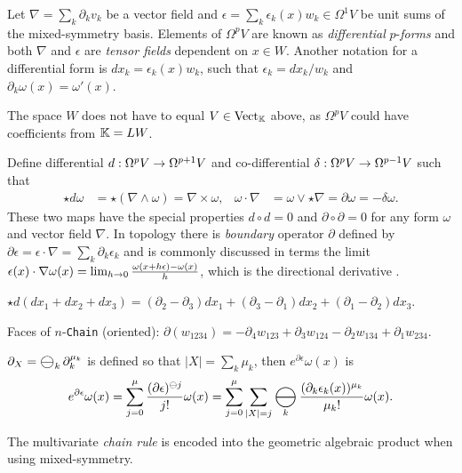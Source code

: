 \documentclass{juliacon}
\DeclareMathOperator*{\bigominus}{\scalerel*{\ominus}{\bigodot}}
\begin{document}
\begin{definition}
	Let $\nabla = \sum_k\partial_kv_k$ be a vector field and $\epsilon = \sum_k\epsilon_k(x)w_k \in \Omega^1V$ be unit sums of the mixed-symmetry basis.
	Elements of $\Omega^pV$ are known as \textit{differential} $p$-\textit{forms} and both $\nabla$ and $\epsilon$ are \textit{tensor fields} dependent on $x\in W$.
	Another notation for a differential form is $dx_k = \epsilon_k(x)w_k$, such that $\epsilon_k = dx_k/w_k$ and $\partial_k\omega(x) = \omega'(x)$.
\end{definition}
\begin{remark}
	The space $W$ does not have to equal $V\in\text{Vect}_{\mathbb{K}}$ above, as $\Omega^pV$ could have coefficients from $\mathbb{K} = LW$.
\end{remark}
\begin{definition}
	Define differential $d:\Omega^p V\rightarrow\Omega^{p+1}V$ and co-differential $\delta:\Omega^pV\rightarrow\Omega^{p-1}V$ such that \cite{bishop-goldberg}
	\begin{align*}
		\star d\omega &= \star(\nabla\wedge\omega) = \nabla\times\omega, & \omega\cdot\nabla &= \omega\vee\star\nabla = \partial\omega =-\delta\omega.
	\end{align*}
	These two maps have the special properties $d\circ d=0$ and $\partial\circ\partial = 0$ for any form $\omega$ and vector field $\nabla$. 
	In topology there is \textit{boundary} operator $\partial$ defined by $\partial\epsilon = \epsilon\cdot\nabla = \sum_k\partial_k\epsilon_k$ and is commonly discussed in terms the limit $\epsilon(x)\cdot\nabla\omega(x) = \lim_{h\rightarrow0} \frac{\omega(x+h\epsilon)-\omega(x)}{h}$, which is the directional derivative \cite{sobczyk}.
\end{definition}
\begin{example}
	$\star d(dx_1+dx_2+dx_3) = (∂_2 -∂_3)dx_1 + (∂_3 -∂_1)dx_2 + (∂_1 -∂_2)dx_3$.
\end{example}
\begin{example}
	Faces of $n$-\verb`Chain` (oriented): $\partial(w_{1234}) = -\partial_4w_{123}+\partial_3w_{124}-\partial_2w_{134}+\partial_1w_{234}$.
\end{example}
\begin{theorem}
	$\partial_X=\bigominus_k\partial_k^{\mu_k}$ is defined so that $|X|=\sum_k\mu_k$, then $e^{\partial\epsilon}\omega(x)$ is
	\begin{align*}
		e^{\partial\epsilon}\omega(x) =
		\sum_{j=0}^\mu \frac{(\partial\epsilon)^{\ominus j}}{j!}\omega(x)
		= \sum_{j=0}^\mu\sum_{|X|=j} \bigominus_k \frac{(\partial_{k}\epsilon_k(x))^{\mu_{k}}}{\mu_k!}\omega(x).
	\end{align*}
\end{theorem}
The multivariate \textit{chain rule} is encoded into the geometric algebraic product when using mixed-symmetry.
\end{document}
